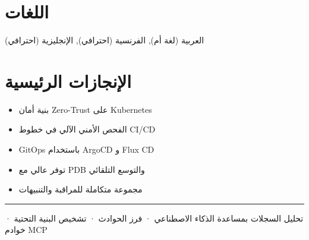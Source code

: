 \documentclass[10pt,a4paper]{article}
\begin{document}
\section*{اللغات}
العربية (لغة أم), الفرنسية (احترافي), الإنجليزية (احترافي)\par
\section*{الإنجازات الرئيسية}
\begin{itemize}
  \item بنية أمان Zero-Trust على Kubernetes
  \item الفحص الأمني الآلي في خطوط CI/CD
  \item GitOps باستخدام ArgoCD و Flux CD
  \item توفر عالي مع PDB والتوسع التلقائي
  \item مجموعة متكاملة للمراقبة والتنبيهات
\end{itemize}
\vspace{6pt}\hrule\vspace{3pt}
{\footnotesize\color{graytext} تحليل السجلات بمساعدة الذكاء الاصطناعي · فرز الحوادث · تشخيص البنية التحتية · خوادم MCP\par}
\end{document}
